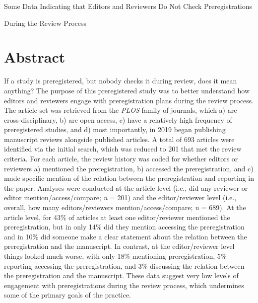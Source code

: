 \documentclass[authordate, empirical]{jote-new-article}
\author[1]{\mbox{Moin Syed\orcid{0000-0003-4759-3555}}}
\affil[1]{University of Minnesota}
\begin{document}
\begin{frontmatter}
  \maketitle
  \begin{abstract}
    \printabstracttext
  \end{abstract}
\end{frontmatter}


	Some Data Indicating that Editors and Reviewers Do Not Check Preregistrations



	During the Review Process



	\section{\textbf{Abstract}}



	If a study is preregistered, but nobody checks it during review, does it mean anything? The purpose of this preregistered study was to better understand how editors and reviewers engage with preregistration plans during the review process. The article set was retrieved from the \emph{PLOS} family of journals, which a) are cross-disciplinary, b) are open access, c) have a relatively high frequency of preregistered studies, and d) most importantly, in 2019 began publishing manuscript reviews alongside published articles. A total of 693 articles were identified via the initial search, which was reduced to 201 that met the review criteria. For each article, the review history was coded for whether editors or reviewers a) mentioned the preregistration, b) accessed the preregistration, and c) made specific mention of the relation between the preregistration and reporting in the paper. Analyses were conducted at the article level (i.e., did any reviewer or editor mention/access/compare; \emph{n} = 201) and the editor/reviewer level (i.e., overall, how many editors/reviewers mention/access/compare; \emph{n} = 689). At the article level, for 43\% of articles at least one editor/reviewer mentioned the preregistration, but in only 14\% did they mention accessing the preregistration and in 10\% did someone make a clear statement about the relation between the preregistration and the manuscript. In contrast, at the editor/reviewer level things looked much worse, with only 18\% mentioning preregistration, 5\% reporting accessing the preregistration, and 3\% discussing the relation between the preregistration and the manuscript. These data suggest very low levels of engagement with preregistrations during the review process, which undermines some of the primary goals of the practice.
\end{document}
